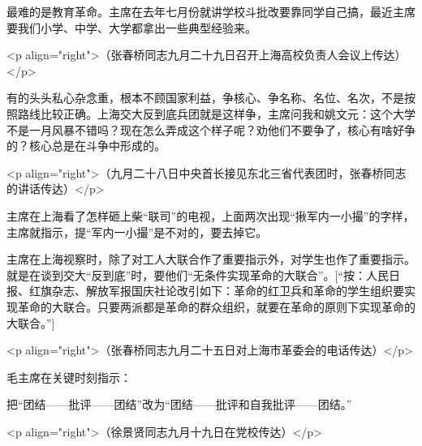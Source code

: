 最难的是教育革命。主席在去年七月份就讲学校斗批改要靠同学自己搞，最近主席要我们小学、中学、大学都拿出一些典型经验来。

<p align="right">（张春桥同志九月二十九日召开上海高校负责人会议上传达）</p>

有的头头私心杂念重，根本不顾国家利益，争核心、争名称、名位、名次，不是按照路线比较正确。上海交大反到底兵团就是这样争，主席问我和姚文元：这个大学不是一月风暴不错吗？现在怎么弄成这个样子呢？劝他们不要争了，核心有啥好争的？核心总是在斗争中形成的。

<p align="right">（九月二十八日中央首长接见东北三省代表团时，张春桥同志的讲话传达）</p>

主席在上海看了怎样砸上柴“联司”的电视，上面两次出现“揪军内一小撮”的字样，主席就指示，提“军内一小撮”是不对的，要去掉它。

主席在上海视察时，除了对工人大联合作了重要指示外，对学生也作了重要指示。就是在谈到交大“反到底”时，要他们“无条件实现革命的大联合”。[“按：人民日报、红旗杂志、解放军报国庆社论改引如下：革命的红卫兵和革命的学生组织要实现革命的大联合。只要两派都是革命的群众组织，就要在革命的原则下实现革命的大联合。”]

<p align="right">（张春桥同志九月二十五日对上海市革委会的电话传达）</p>

毛主席在关键时刻指示：

把“团结——批评——团结”改为“团结——批评和自我批评——团结。”

<p align="right">（徐景贤同志九月十九日在党校传达）</p>


